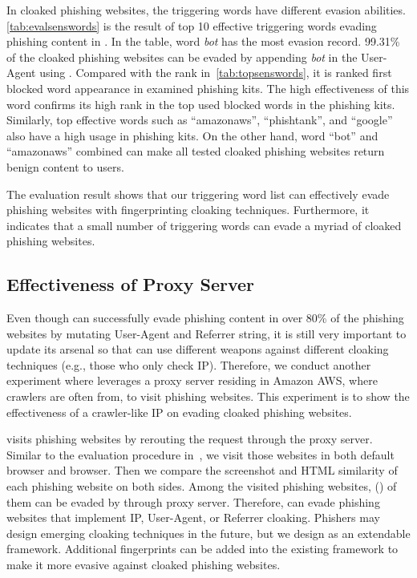 \evalsenswords

In \sensevadephishing cloaked phishing websites, the triggering words have different evasion abilities.
\autoref{tab:evalsenswords} is the result of top 10 effective triggering words evading phishing content in \spartacus.
In the table, word \emph{bot} has the most evasion record.
99.31\% of the cloaked phishing websites can be evaded by appending \emph{bot} in the User-Agent using \spartacus.
Compared with the rank in~\autoref{tab:topsenswords}, it is ranked first blocked word appearance in examined phishing kits.
The high effectiveness of this word confirms its high rank in the top used blocked words in the phishing kits.
Similarly, top effective words such as ``amazonaws'', ``phishtank'', and ``google'' also have a high usage in phishing kits.
On the other hand, word ``bot'' and ``amazonaws'' combined can make all tested cloaked phishing websites return benign content to users.

The evaluation result shows that our triggering word list can effectively evade phishing websites with fingerprinting cloaking techniques.
Furthermore, it indicates that a small number of triggering words can evade a myriad of cloaked phishing websites.


\subsection{Effectiveness of Proxy Server}

Even though \spartacus can successfully evade phishing content in over 80\% of the phishing websites by mutating User-Agent and Referrer string, 
it is still very important to update its arsenal so that \spartacus can use different weapons against different cloaking techniques (e.g., those who only check IP). 
Therefore, we conduct another experiment where \spartacus leverages a proxy server residing in Amazon AWS, where crawlers are often from, to visit phishing websites.
This experiment is to show the effectiveness of a crawler-like IP on evading cloaked phishing websites.


\spartacus visits \proxytotalphishing phishing websites by rerouting the request through the proxy server.
Similar to the evaluation procedure in~,
we visit those websites in both default browser and \spartacus browser.
Then we compare the screenshot and HTML similarity of each phishing website on both sides.
Among the visited phishing websites, \proxyphishingperc (\proxyevadephishing) of them can be evaded by \spartacus through proxy server.
Therefore, \spartacus can evade phishing websites that implement IP, User-Agent, or Referrer cloaking.
Phishers may design emerging cloaking techniques in the future, but we design \spartacus as an extendable framework.
Additional fingerprints can be added into the existing framework to make it more evasive against cloaked phishing websites.


